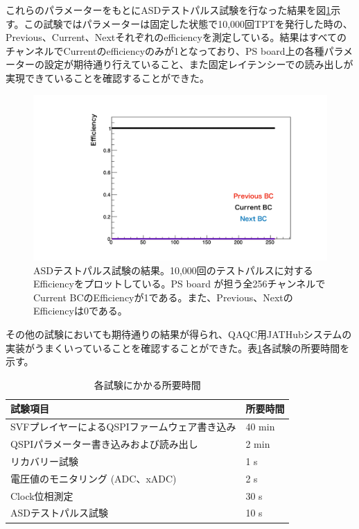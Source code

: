 これらのパラメーターをもとにASDテストパルス試験を行なった結果を図\ref{QAQCresult}示す。この試験ではパラメーターは固定した状態で10,000回TPTを発行した時の、Previous、Current、Nextそれぞれのefficiencyを測定している。結果はすべてのチャンネルでCurrentのefficiencyのみが1となっており、PS board上の各種パラメーターの設定が期待通り行えていること、また固定レイテンシーでの読み出しが実現できていることを確認することができた。

\begin{figure} 
\centering
\includegraphics[width=16cm]{fig/QAQC/QAQCresult.pdf}
\caption[ASDテストパルスの結果]{ASDテストパルス試験の結果。10,000回のテストパルスに対するEfficiencyをプロットしている。PS board が担う全256チャンネルでCurrent BCのEfficiencyが1である。また、Previous、NextのEfficiencyは0である。}
\label{QAQCresult}
\end{figure}

その他の試験においても期待通りの結果が得られ、QAQC用JATHubシステムの実装がうまくいっていることを確認することができた。表\ref{table_testtime}各試験の所要時間を示す。

\begin{table}[]
    \centering
    \caption{各試験にかかる所要時間}
    \label{table_testtime}    
    \begin{tabular}{ll}
    \hline
    試験項目                          & 所要時間   \\ \hline
    SVFプレイヤーによるQSPIファームウェア書き込み    & 40 min \\
    QSPIパラメーター書き込みおよび読み出し         & 2 min  \\
    リカバリー試験                       & 1 s    \\
    電圧値のモニタリング (ADC、xADC) & 2 s    \\
    Clock位相測定                     & 30 s   \\
    ASDテストパルス試験                   & 10 s  
    \end{tabular}
\end{table}

